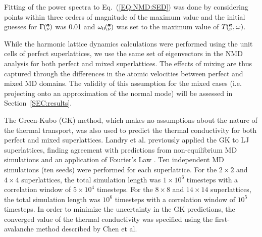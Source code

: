 \begin{comment}
In accordance with anharmonic theory,\cite{maradudin_scattering_1962} the power spectrum can be approximated to be a Lorentzian function, centered at $\omega_0\kv$, which is shifted from the $\omega\kv$,  with a full width at half maximum $\Gamma\kv$ of the form 
\begin{equation}\label{EQ:NMD:LOR}
T\kvw \approx C_0\kv\frac{\Gamma\kv/\pi}{[\omega_0\kv-\omega]^2+\Gamma^2\kv},
\end{equation}
when $\Gamma\kv \ll \omega\kv$. Fitting Eq.~(\ref{EQ:NMD:LOR}) to Eq.~(\ref{EQ:NMD:SED}) yields the phonon lifetime from\cite {PhysRevB.81.081411}
\begin{equation}\label{EQ:lifetime}
\tau\kv=\frac{1}{2\Gamma\kv}.
\end{equation}
\end{comment}
Fitting of the power spectra to Eq.~(\ref{EQ:NMD:SED}) was done by considering points within three orders of magnitude of the maximum value and the initial guesses for $\Gamma\mspace{-4.0mu}\left(\mspace{-8.0mu} \begin{smallmatrix}&\pmb{\kappa} \\&\nu\end{smallmatrix} \mspace{-3.0mu}\right)$ was 0.01 and $\omega_0\mspace{-4.0mu}\left(\mspace{-8.0mu} \begin{smallmatrix}&\pmb{\kappa} \\&\nu\end{smallmatrix} \mspace{-3.0mu}\right)$ was set to the maximum value of $T\mspace{-4.0mu}\left(\mspace{-8.0mu} \begin{smallmatrix}&\pmb{\kappa} \\&\nu\end{smallmatrix} \mspace{-2.0mu},\omega\right)$. 

While the harmonic lattice dynamics calculations were performed using the unit cells of perfect superlattices, we use the same set of eigenvectors in the NMD analysis for both perfect and mixed superlattices. The effects of mixing are thus captured through the differences in the atomic velocities between perfect and mixed MD domains. The validity of this assumption for the mixed cases (i.e. projecting onto an approximation of the normal mode) will be assessed in Section~\ref{SEC:results}.

The Green-Kubo (GK) method, which makes no assumptions about the nature of the thermal transport, was also used to predict the thermal conductivity for both perfect and mixed superlattices. Landry et al. previously applied the GK to LJ superlattices, finding agreement with predictions from non-equilibrium MD simulations and an application of Fourier's Law \cite{PhysRevB.79.075316}.
Ten independent MD simulations  (ten seeds) were performed for each superlattice. For the $2 \times 2$ and $4 \times 4$ superlattices, the total  simulation length was $1\times 10^6$ timesteps with a correlation window of $5\times 10^4$ timesteps.  For the $8 \times 8$ and $14 \times 14$ superlattices, the total  simulation length was $10^6$ timesteps with a correlation window of $10^5$ timesteps. In order to minimize the uncertainty in the GK predictions, the converged value of the thermal conductivity was specified using the first-avalanche method described by Chen et al. \cite{Chen20102392}


